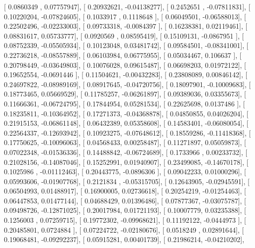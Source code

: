 \documentclass{article}
\begin{document}
       [ 0.0860349 ,  0.07757947],
       [ 0.20932621, -0.04138277],
       [ 0.2452651 , -0.07811831],
       [ 0.10220204, -0.07824605],
       [ 0.1033917 ,  0.1118648 ],
       [ 0.06049501, -0.06588013],
       [ 0.22502496, -0.02233003],
       [ 0.09733318, -0.0084397 ],
       [ 0.16238381,  0.02119461],
       [ 0.08831617,  0.05733777],
       [ 0.0920569 ,  0.08595419],
       [ 0.15109131, -0.0867951 ],
       [ 0.08752339, -0.05505934],
       [ 0.10123048,  0.03481742],
       [ 0.09584501, -0.08341001],
       [ 0.22736218, -0.08557889],
       [ 0.06103984,  0.06775955],
       [ 0.05034467,  0.106637  ],
       [ 0.20798449, -0.03649803],
       [ 0.10076028,  0.09615487],
       [ 0.06698203,  0.01972122],
       [ 0.19652554, -0.0691446 ],
       [ 0.11504621, -0.00432283],
       [ 0.23808089,  0.00846142],
       [ 0.24697822, -0.08989169],
       [ 0.08917645, -0.04720756],
       [ 0.18097901, -0.10009683],
       [ 0.18773465,  0.05669529],
       [ 0.11785257, -0.06261897],
       [ 0.09389036,  0.03355673],
       [ 0.11666361, -0.06724795],
       [ 0.17844954,  0.05281534],
       [ 0.22625698,  0.0137486 ],
       [ 0.18235811, -0.10364952],
       [ 0.17271373, -0.04368878],
       [ 0.04850855,  0.04026204],
       [ 0.21915153, -0.06861148],
       [ 0.06432389,  0.05358608],
       [ 0.14583401, -0.06080054],
       [ 0.22564337, -0.12693942],
       [ 0.10923275, -0.07648612],
       [ 0.18559286, -0.11418368],
       [ 0.17750625, -0.10096063],
       [ 0.04568433,  0.00258487],
       [ 0.11271897,  0.05059873],
       [ 0.07022348, -0.01536336],
       [ 0.14488842, -0.06724689],
       [ 0.1733966 ,  0.00233732],
       [ 0.21028156, -0.14087046],
       [ 0.15252991,  0.01940907],
       [ 0.23499085, -0.14670178],
       [ 0.1025986 , -0.01112463],
       [ 0.20443775, -0.0896306 ],
       [ 0.09042233,  0.01000296],
       [ 0.05993606, -0.01907768],
       [ 0.2121834 , -0.05315705],
       [ 0.12643905, -0.02945591],
       [ 0.06504993,  0.01488917],
       [ 0.16900005,  0.02736618],
       [ 0.20254219, -0.01254463],
       [ 0.06447853,  0.01477144],
       [ 0.04688429,  0.01396486],
       [ 0.07877367, -0.03075787],
       [ 0.09498726, -0.12871025],
       [ 0.20017984,  0.01721193],
       [ 0.10007779,  0.03235388],
       [ 0.1256003 ,  0.07259715],
       [ 0.19772302, -0.09968621],
       [ 0.11192122, -0.0444973 ],
       [ 0.20485801,  0.0724884 ],
       [ 0.07224722, -0.02180676],
       [ 0.0518249 ,  0.02891644],
       [ 0.19068481, -0.09292237],
       [ 0.05915281,  0.00401739],
       [ 0.21986214, -0.04210202],
\end{document}
